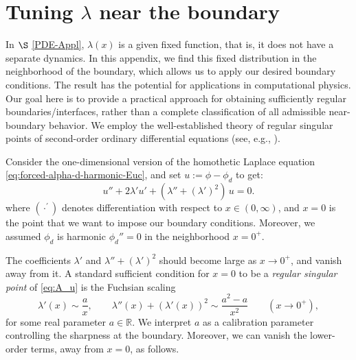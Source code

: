 \documentclass[preprint,12pt]{elsarticle}
\theoremstyle{plain}
\theoremstyle{definition}
\theoremstyle{note}
\newcommand{\R}{\mathbb{R}}
\begin{document}
\appendix
\section{Tuning $\lambda$ near the boundary}\label{lambda_bcs}

In $\S$ \ref{PDE-Appl}, $\lambda(x)$ is a given fixed function, that is, it does not have a separate dynamics. In this appendix, we find this fixed distribution in the neighborhood of the boundary, which allows us to apply our desired boundary conditions. The result has the potential for applications in computational physics. Our goal here is to provide a practical approach for obtaining sufficiently regular boundaries/interfaces, rather than a complete classification of all admissible near-boundary behavior. We employ the well-established theory of regular singular points of second-order ordinary differential equations (see, e.g., \cite{CoddingtonLevinson1955,Simmons2016}). 

Consider the one-dimensional version of the homothetic Laplace equation \eqref{eq:forced-alpha-d-harmonic-Euc}, and set $u:=\phi-\phi_d$ to get:
\begin{equation}\label{eq:A_u}
u''+2\lambda' u' + (\lambda''+(\lambda')^2)\,u=0.
\end{equation}
where $(\cdot^\prime)$ denotes differentiation with respect to $x\in (0,\infty)$, and $x=0$ is the point that we want to impose our boundary conditions. Moreover, we assumed $\phi_d$ is harmonic $\phi_d''=0$ in the neighborhood $x=0^+$.

The coefficients $\lambda'$ and $\lambda''+(\lambda')^2$ should become large as $x\to 0^+$, and vanish away from it. A standard sufficient condition for $x=0$ to be a \emph{regular singular point} of \eqref{eq:A_u} is the Fuchsian scaling
\begin{equation}\label{eq:A_fuchs}
\lambda'(x)\sim \frac{a}{x},
\qquad
\lambda''(x)+(\lambda'(x))^2 \sim \frac{a^2-a}{x^2}
\qquad (x\to 0^+),
\end{equation}
for some real parameter $a\in\R$. We interpret $a$ as a calibration parameter controlling the sharpness at the boundary. Moreover, we can vanish the lower-order terms, away from $x=0$, as follows.
\end{document}
